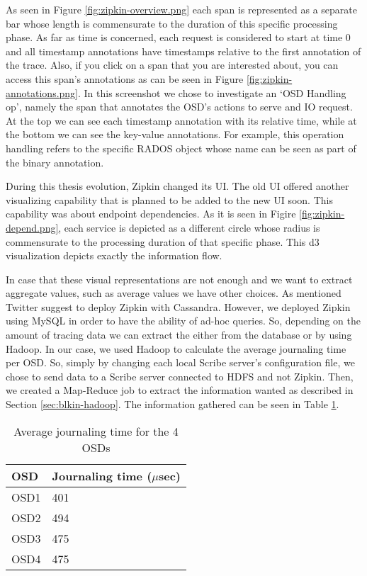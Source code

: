 As seen in Figure \ref{fig:zipkin-overview.png} each span is represented as a
separate bar whose length is commensurate to the duration of this specific
processing phase. As far as time is concerned, each request is considered to
start at time 0 and all timestamp annotations have timestamps relative to the
first annotation of the trace. Also, if you click on a span that you are
interested about, you can access this span's annotations as can be seen in
Figure \ref{fig:zipkin-annotations.png}. In this screenshot we chose to
investigate an `OSD Handling op', namely the span that annotates the OSD's
actions to serve and IO request. At the top we can see each timestamp annotation
with its relative time, while at the bottom we can see the key-value
annotations. For example, this operation handling refers to the specific RADOS
object whose name can be seen as part of the binary annotation.


During this thesis evolution, Zipkin changed its UI. The old UI offered another
visualizing capability that is planned to be added to the new UI soon. This
capability was about endpoint dependencies. As it is seen in Figire
\ref{fig:zipkin-depend.png}, each service is depicted as a different circle
whose radius is commensurate to the processing duration of that specific phase.
This d3 visualization depicts exactly the information flow.


In case that these visual representations are not enough and we want to extract
aggregate values, such as average values we have other choices. As mentioned
Twitter suggest to deploy Zipkin with Cassandra. However, we deployed Zipkin
using MySQL in order to have the ability of ad-hoc queries. So, depending on the
amount of tracing data we can extract the either from the database or by using
Hadoop. In our case, we used Hadoop to calculate the average journaling time per
OSD. So, simply by changing each local Scribe server's configuration file, we
chose to send data to a Scribe server connected to HDFS and not Zipkin. Then, we
created a Map-Reduce job to extract the information wanted as described in
Section \ref{sec:blkin-hadoop}. The information gathered can be seen in Table
\ref{tab:hadoop-journal}.

\begin{table}[H]
    \centering
    \begin{tabular}{ | l | l | }
        \hline
        OSD  & Journaling time ($\mu$sec)  \\ \hline \hline
        OSD1 & 401  \\ \hline
        OSD2 & 494  \\ \hline
        OSD3 & 475  \\ \hline
        OSD4 & 475  \\ \hline
    \end{tabular}
    \caption{Average journaling time for the 4 OSDs}
    \label{tab:hadoop-journal}
\end{table}

